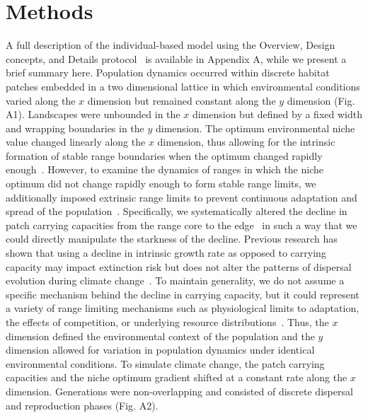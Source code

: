 \documentclass[11pt]{article}
\begin{document}
\section*{Methods}
A full description of the individual-based model using the Overview, Design concepts, and Details protocol~\citep{grimm2010odd} is available in Appendix A, while we present a brief summary here. Population dynamics occurred within discrete habitat patches embedded in a two dimensional lattice in which environmental conditions varied along the $x$ dimension but remained constant along the $y$ dimension (Fig. A1). Landscapes were unbounded in the $x$ dimension but defined by a fixed width and wrapping boundaries in the $y$ dimension. The optimum environmental niche value changed linearly along the $x$ dimension, thus allowing for the intrinsic formation of stable range boundaries when the optimum changed rapidly enough~\citep{kirkpatrick1997evolution, alleaume2006geographical, polechova2015limits, polechova2018sky}. However, to examine the dynamics of ranges in which the niche optimum did not change rapidly enough to form stable range limits, we additionally imposed extrinsic range limits to prevent continuous adaptation and spread of the population~\citep{alleaume2006geographical, garcia1997genetic}. Specifically, we systematically altered the decline in patch carrying capacities from the range core to the edge~\citep{alleaume2006geographical, henry2013eco, bocedi2014rangeshifter, mustin2009dynamics} in such a way that we could directly manipulate the starkness of the decline. Previous research has shown that using a decline in intrinsic growth rate as opposed to carrying capacity may impact extinction risk but does not alter the patterns of dispersal evolution during climate change~\citep{henry2013eco}. To maintain generality, we do not assume a specific mechanism behind the decline in carrying capacity, but it could represent a variety of range limiting mechanisms such as physiological limits to adaptation, the effects of competition, or underlying resource distributions~\citep{sexton2009evolution, holt2005theoretical, case2000interspecific}. Thus, the $x$ dimension defined the environmental context of the population and the $y$ dimension allowed for variation in population dynamics under identical environmental conditions. To simulate climate change, the patch carrying capacities and the niche optimum gradient shifted at a constant rate along the $x$ dimension. Generations were non-overlapping and consisted of discrete dispersal and reproduction phases (Fig. A2).
\end{document}
